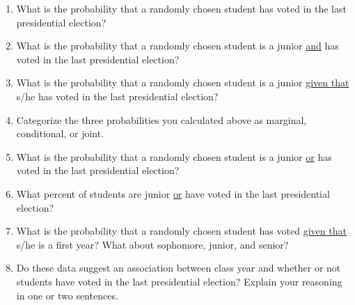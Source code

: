 \documentclass[11pt]{article}
\begin{document}
\begin{enumerate}

\item  What is the probability that a randomly chosen student has voted in the last presidential election?

\item What is the probability that a randomly chosen student is a junior \underline{and} has voted in the last presidential election?

\item What is the probability that a randomly chosen student is a junior \underline{given that} s/he has voted in the last presidential election?

\item Categorize the three probabilities you calculated above as marginal, conditional, or joint.

\item What is the probability that a randomly chosen student is a junior \underline{or} has voted in the last presidential election?

\item What percent of students are junior \underline{or} have voted in the last presidential election?

\item What is the probability that a randomly chosen student has voted \underline{given that} s/he is a first year? What about sophomore, junior, and senior?

\item Do these data suggest an association between class year and whether or not students have voted in the last presidential election? Explain your reasoning in one or two sentences.

\end{enumerate}

\end{document}
